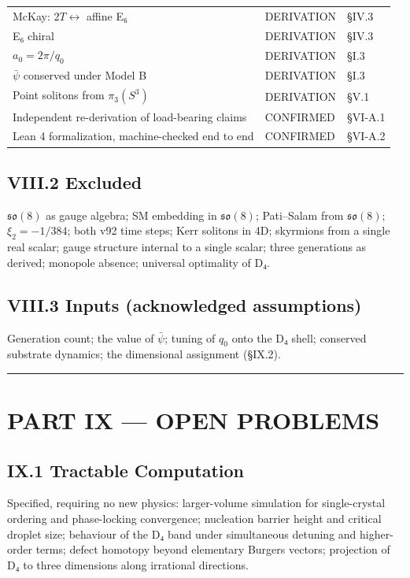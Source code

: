 \documentclass[a4paper,11pt]{article}
\begin{document}
\begin{center}
\begin{xltabular}{\linewidth}{llX}
McKay: $2T\leftrightarrow$ affine E₆ & DERIVATION & §IV.3 \\
E₆ chiral & DERIVATION & §IV.3 \\
$a_0=2\pi/q_0$ & DERIVATION & §I.3 \\
$\bar\psi$ conserved under Model B & DERIVATION & §I.3 \\
Point solitons from $\pi_3(S^3)$ & DERIVATION & §V.1 \\
Independent re-derivation of load-bearing claims & CONFIRMED & §VI-A.1 \\
Lean 4 formalization, machine-checked end to end & CONFIRMED & §VI-A.2 \\
\hline
\end{xltabular}
\end{center}

\subsection*{VIII.2 Excluded}

$\mathfrak{so}(8)$ as gauge algebra; SM embedding in $\mathfrak{so}(8)$; Pati–Salam from $\mathfrak{so}(8)$; $\xi_2=-1/384$; both v92 time steps; Kerr solitons in 4D; skyrmions from a single real scalar; gauge structure internal to a single scalar; three generations as derived; monopole absence; universal optimality of D₄.

\subsection*{VIII.3 Inputs (acknowledged assumptions)}

Generation count; the value of $\bar\psi$; tuning of $q_0$ onto the D₄ shell; conserved substrate dynamics; the dimensional assignment (§IX.2).

\medskip\hrule\medskip

\section*{PART IX — OPEN PROBLEMS}

\subsection*{IX.1 Tractable Computation}

Specified, requiring no new physics: larger-volume simulation for single-crystal ordering and phase-locking convergence; nucleation barrier height and critical droplet size; behaviour of the D₄ band under simultaneous detuning and higher-order terms; defect homotopy beyond elementary Burgers vectors; projection of D₄ to three dimensions along irrational directions.
\end{document}

